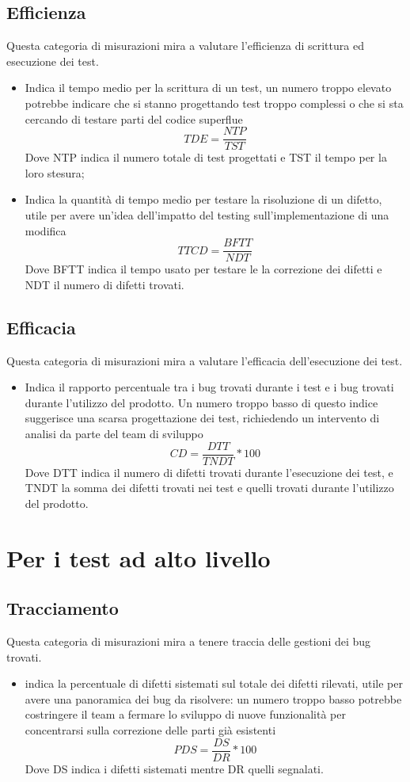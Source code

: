 \documentclass[PianoDiProgetto.tex]{subfiles}
\begin{document}
\subsection{Efficienza}
Questa categoria di misurazioni mira a valutare l'efficienza di scrittura ed esecuzione dei test.
\begin{itemize}
	\item {} Indica il tempo medio per la scrittura di un test, un numero troppo elevato potrebbe indicare che si stanno progettando test troppo complessi o che si sta cercando di testare parti del codice superflue
	\[TDE=\dfrac{NTP}{TST}\]
	Dove NTP indica il numero totale di test progettati e TST il tempo per la loro stesura;
	\item {} Indica la quantità di tempo medio per testare la risoluzione di un difetto, utile per avere un'idea dell'impatto del testing sull'implementazione di una modifica
	\[TTCD=\dfrac{BFTT}{NDT}\]
	Dove BFTT indica il tempo usato per testare le la correzione dei difetti e NDT il numero di difetti trovati.
\end{itemize}
\subsection{Efficacia}
Questa categoria di misurazioni mira a valutare l'efficacia dell'esecuzione dei test.
\begin{itemize}
	\item {} Indica il rapporto percentuale tra i bug trovati durante i test e i bug trovati durante l'utilizzo del prodotto. Un numero troppo basso di questo indice suggerisce una scarsa progettazione dei test, richiedendo un intervento di analisi da parte del team di sviluppo
	\[CD=\dfrac{DTT}{TNDT}*100\]
	Dove DTT indica il numero di difetti trovati durante l'esecuzione dei test, e TNDT la somma dei difetti trovati nei test e quelli trovati durante l'utilizzo del prodotto.
\end{itemize}
\section{Per i test ad alto livello}
\subsection{Tracciamento}
Questa categoria di misurazioni mira a tenere traccia delle gestioni dei bug trovati.
\begin{itemize}
	\item {} indica la percentuale di difetti sistemati sul totale dei difetti rilevati, utile per avere una panoramica dei bug da risolvere: un numero troppo basso potrebbe costringere il team a fermare lo sviluppo di nuove funzionalità per concentrarsi sulla correzione delle parti già esistenti
	\[PDS=\dfrac{DS}{DR}*100\]
	Dove DS indica i difetti sistemati mentre DR quelli segnalati.	
\end{itemize}
\end{document}
